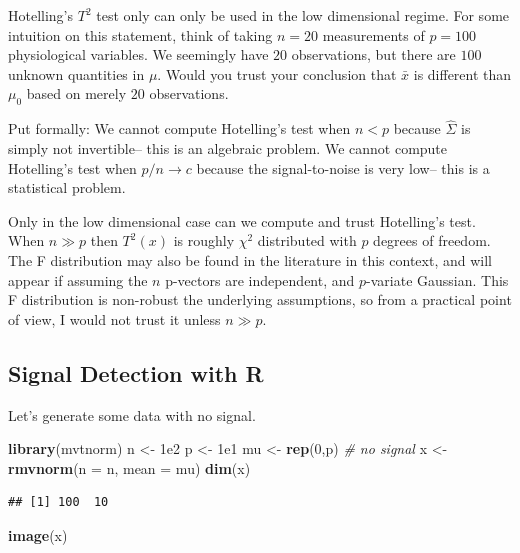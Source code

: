 \documentclass[]{book}
\newenvironment{Shaded}{\begin{snugshade}}{\end{snugshade}}
\newcommand{\KeywordTok}[1]{\textcolor[rgb]{0.13,0.29,0.53}{\textbf{{#1}}}}
\newcommand{\DataTypeTok}[1]{\textcolor[rgb]{0.13,0.29,0.53}{{#1}}}
\newcommand{\DecValTok}[1]{\textcolor[rgb]{0.00,0.00,0.81}{{#1}}}
\newcommand{\FloatTok}[1]{\textcolor[rgb]{0.00,0.00,0.81}{{#1}}}
\newcommand{\StringTok}[1]{\textcolor[rgb]{0.31,0.60,0.02}{{#1}}}
\newcommand{\CommentTok}[1]{\textcolor[rgb]{0.56,0.35,0.01}{\textit{{#1}}}}
\newcommand{\NormalTok}[1]{{#1}}
\theoremstyle{definition}
\theoremstyle{definition}
\theoremstyle{remark}
\begin{document}
Hotelling's \(T^2\) test only can only be used in the low dimensional
regime. For some intuition on this statement, think of taking \(n=20\)
measurements of \(p=100\) physiological variables. We seemingly have
\(20\) observations, but there are \(100\) unknown quantities in
\(\mu\). Would you trust your conclusion that \(\bar x\) is different
than \(\mu_0\) based on merely \(20\) observations.

Put formally: We cannot compute Hotelling's test when \(n<p\) because
\(\hat \Sigma\) is simply not invertible-- this is an algebraic problem.
We cannot compute Hotelling's test when \(p/n \to c\) because the
signal-to-noise is very low-- this is a statistical problem.

Only in the low dimensional case can we compute and trust Hotelling's
test. When \(n \gg p\) then \(T^2(x)\) is roughly \(\chi^2\) distributed
with \(p\) degrees of freedom. The F distribution may also be found in
the literature in this context, and will appear if assuming the \(n\)
p-vectors are independent, and \(p\)-variate Gaussian. This F
distribution is non-robust the underlying assumptions, so from a
practical point of view, I would not trust it unless \(n \gg p\).

\subsection{Signal Detection with R}\label{signal-detection-with-r}

Let's generate some data with no signal.

\begin{Shaded}
\begin{Highlighting}[]
\KeywordTok{library}\NormalTok{(mvtnorm)}
\NormalTok{n <-}\StringTok{ }\FloatTok{1e2}
\NormalTok{p <-}\StringTok{ }\FloatTok{1e1}
\NormalTok{mu <-}\StringTok{ }\KeywordTok{rep}\NormalTok{(}\DecValTok{0}\NormalTok{,p) }\CommentTok{# no signal}
\NormalTok{x <-}\StringTok{ }\KeywordTok{rmvnorm}\NormalTok{(}\DataTypeTok{n =} \NormalTok{n, }\DataTypeTok{mean =} \NormalTok{mu)}
\KeywordTok{dim}\NormalTok{(x)}
\end{Highlighting}
\end{Shaded}

\begin{verbatim}
## [1] 100  10
\end{verbatim}

\begin{Shaded}
\begin{Highlighting}[]
\KeywordTok{image}\NormalTok{(x)}
\end{Highlighting}
\end{Shaded}
\end{document}
